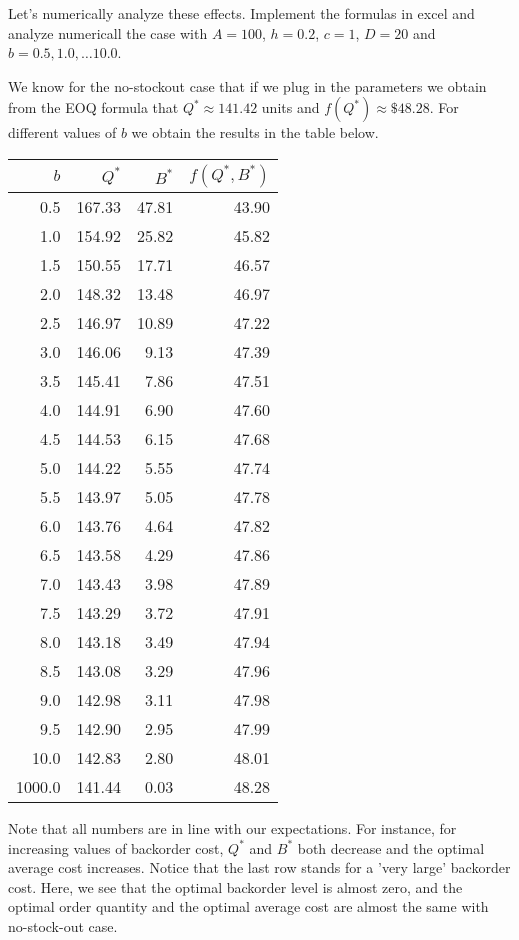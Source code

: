 \begin{exercise}
Let's numerically analyze these effects. Implement the formulas in excel and analyze numericall the case with $A=100$, $h=0.2$, $c=1$,  $D=20$ and  $b=0.5,1.0,\ldots 10.0$.

\begin{solution}
We know for the no-stockout case that if we plug in the parameters we obtain from the EOQ formula that $Q^{*} \approx 141.42$ units and $f(Q^{*}) \approx \mathdollar 48.28$. For different values of $b$ we obtain the results in the table below. 

\begin{center}
    \begin{tabular}{rrrr}
    \toprule
    $b$ & $Q^*$ & $B^*$ & $f(Q^*,B^*)$ \\
    \midrule
    0.5   & 167.33 & 47.81 & 43.90 \\
    1.0   & 154.92 & 25.82 & 45.82 \\
    1.5   & 150.55 & 17.71 & 46.57 \\
    2.0   & 148.32 & 13.48 & 46.97 \\
    2.5   & 146.97 & 10.89 & 47.22 \\
    3.0   & 146.06 & 9.13  & 47.39 \\
    3.5   & 145.41 & 7.86  & 47.51 \\
    4.0   & 144.91 & 6.90  & 47.60 \\
    4.5   & 144.53 & 6.15  & 47.68 \\
    5.0   & 144.22 & 5.55  & 47.74 \\
    5.5   & 143.97 & 5.05  & 47.78 \\
    6.0   & 143.76 & 4.64  & 47.82 \\
    6.5   & 143.58 & 4.29  & 47.86 \\
    7.0   & 143.43 & 3.98  & 47.89 \\
    7.5   & 143.29 & 3.72  & 47.91 \\
    8.0   & 143.18 & 3.49  & 47.94 \\
    8.5   & 143.08 & 3.29  & 47.96 \\
    9.0   & 142.98 & 3.11  & 47.98 \\
    9.5   & 142.90 & 2.95  & 47.99 \\
    10.0  & 142.83 & 2.80  & 48.01 \\
	1000.0	& 141.44 & 0.03	& 48.28 \\
    \bottomrule
    \end{tabular}%
\end{center}

Note that all numbers are in line with our expectations. For instance, for increasing values of backorder cost, $Q^*$ and $B^*$ both decrease and the optimal average cost increases. Notice that the last row stands for a 'very large' backorder cost. Here, we see that the optimal backorder level is almost zero, and the optimal order quantity and the optimal average cost are almost the same with no-stock-out case. 
\end{solution}
\end{exercise}


